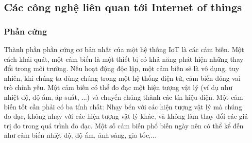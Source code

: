 
\subsection{Các công nghệ liên quan tới Internet of things}
\subsubsection{Phần cứng}
Thành phần phần cứng cơ bản nhất của một hệ thống IoT là các cảm biến. Một cách khái quát, một cảm biến là một thiết bị có khả năng phát hiện những thay đổi trong môi trường. Nếu hoạt động độc lập, một cảm biến sẽ là vô dụng, tuy nhiên, khi chúng ta dùng chúng trong một hệ thống điện tử, cảm biến đóng vai trò chính yếu. Một cảm biến  có thể đo đạc một hiện tượng vật lý (ví dụ như nhiệt độ, độ ẩm, áp suất, ...) và chuyển chúng thành các tín hiệu điện. Một cảm biến tốt cần phải có ba tính chất: Nhạy bén với các hiện tượng vật lý mà chúng đo đạc, không nhạy với các hiện tượng vật lý khác, và không làm thay đổi các giá trị đo trong quá trình đo đạc. Một số cảm biến phổ biến ngày nên có thể kể đến như cảm biến nhiệt độ, độ ẩm, ánh sáng, gia tốc,...\\ %

